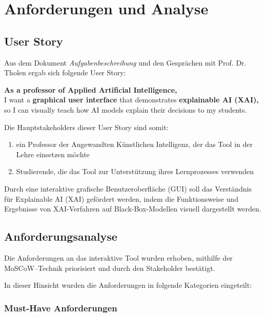 \chapter{Anforderungen und Analyse}
\label{chap:chapter-3}
\section{User Story}

Aus dem Dokument \textit{Aufgabenbeschreibung} und den Gesprächen mit Prof. Dr. Tholen ergab sich folgende User Story:

\begin{center}
\begin{tcolorbox}[colback=gray!10, colframe=black, width=0.9\textwidth, sharp corners=south]
\textbf{As a professor of Applied Artificial Intelligence,}\\
I want a \textbf{graphical user interface} that demonstrates \textbf{explainable AI (XAI),}\\
so I can visually teach how AI models explain their decisions to my students.
\end{tcolorbox}
\end{center}

Die Hauptstakeholders dieser User Story sind somit:
\begin{enumerate}
    \item ein Professor der Angewandten Künstlichen Intelligenz, der das Tool in der Lehre einsetzen möchte
    \item Studierende, die das Tool zur Unterstützung ihres Lernprozesses verwenden
\end{enumerate}
    
Durch eine interaktive grafische Benutzeroberfläche (GUI) soll das Verständnis für Explainable AI (XAI) gefördert werden, indem die Funktionsweise und Ergebnisse von XAI-Verfahren auf Black-Box-Modellen visuell dargestellt werden.\\

\section{Anforderungsanalyse}

Die Anforderungen an das interaktive Tool wurden erhoben, mithilfe der MoSCoW–Technik priorisiert und durch den Stakeholder bestätigt.

In dieser Hinsicht wurden die Anforderungen in folgende Kategorien eingeteilt:

\subsection{Must-Have Anforderungen}


